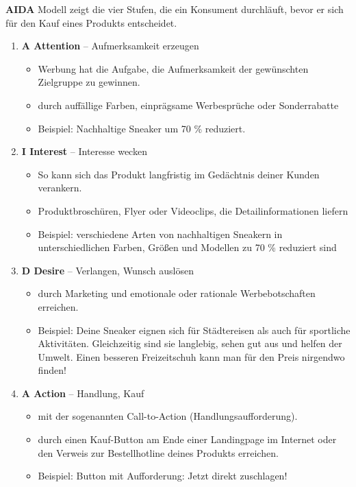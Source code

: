 \textbf{AIDA} Modell zeigt die vier Stufen, die ein Konsument
durchläuft, bevor er sich für den Kauf eines Produkts entscheidet.

\begin{enumerate}
\item
  \textbf{A Attention} -- Aufmerksamkeit erzeugen

  \begin{itemize}
  \item
    Werbung hat die Aufgabe, die Aufmerksamkeit der gewünschten
    Zielgruppe zu gewinnen.
  \item
    durch auffällige Farben, einprägsame Werbesprüche oder Sonderrabatte
  \item
    Beispiel: Nachhaltige Sneaker um 70 \% reduziert.
  \end{itemize}
\item
  \textbf{I Interest} -- Interesse wecken

  \begin{itemize}
  \item
    So kann sich das Produkt langfristig im Gedächtnis deiner Kunden
    verankern.
  \item
    Produktbroschüren, Flyer oder Videoclips, die Detailinformationen
    liefern
  \item
    Beispiel: verschiedene Arten von nachhaltigen Sneakern in
    unterschiedlichen Farben, Größen und Modellen zu 70 \% reduziert
    sind
  \end{itemize}
\item
  \textbf{D Desire} -- Verlangen, Wunsch auslösen

  \begin{itemize}
  \item
    durch Marketing und emotionale oder rationale Werbebotschaften
    erreichen.
  \item
    Beispiel: Deine Sneaker eignen sich für Städtereisen als auch für
    sportliche Aktivitäten. Gleichzeitig sind sie langlebig, sehen gut
    aus und helfen der Umwelt. Einen besseren Freizeitschuh kann man für
    den Preis nirgendwo finden!
  \end{itemize}
\item
  \textbf{A Action} -- Handlung, Kauf

  \begin{itemize}
  \item
    mit der sogenannten Call-to-Action (Handlungsaufforderung).
  \item
    durch einen Kauf-Button am Ende einer Landingpage im Internet oder
    den Verweis zur Bestellhotline deines Produkts erreichen.
  \item
    Beispiel: Button mit Aufforderung: Jetzt direkt zuschlagen!
  \end{itemize}
\end{enumerate}

